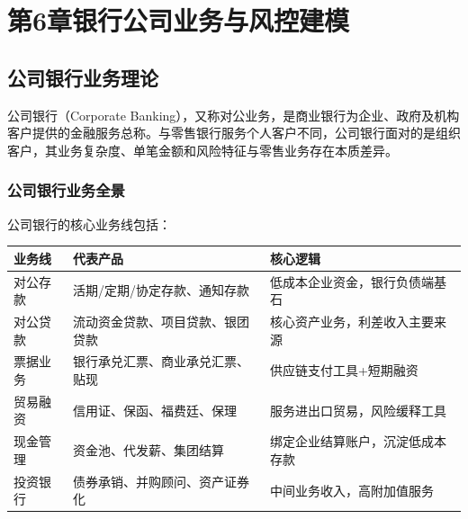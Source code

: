 
\chapter{第6章\quad 银行公司业务与风控建模}

\section{公司银行业务理论}

公司银行（Corporate Banking），又称对公业务，是商业银行为企业、政府及机构客户提供的金融服务总称。与零售银行服务个人客户不同，公司银行面对的是组织客户，其业务复杂度、单笔金额和风险特征与零售业务存在本质差异。

\subsection{公司银行业务全景}

公司银行的核心业务线包括：

\begin{table}[H]
\centering
\begin{tabular}{lp{3.5cm}p{5.5cm}}
\toprule
\textbf{业务线} & \textbf{代表产品} & \textbf{核心逻辑} \\
\midrule
对公存款 & 活期/定期/协定存款、通知存款 & 低成本企业资金，银行负债端基石 \\
对公贷款 & 流动资金贷款、项目贷款、银团贷款 & 核心资产业务，利差收入主要来源 \\
票据业务 & 银行承兑汇票、商业承兑汇票、贴现 & 供应链支付工具+短期融资 \\
贸易融资 & 信用证、保函、福费廷、保理 & 服务进出口贸易，风险缓释工具 \\
现金管理 & 资金池、代发薪、集团结算 & 绑定企业结算账户，沉淀低成本存款 \\
投资银行 & 债券承销、并购顾问、资产证券化 & 中间业务收入，高附加值服务 \\
\bottomrule
\end{tabular}
\end{table}

